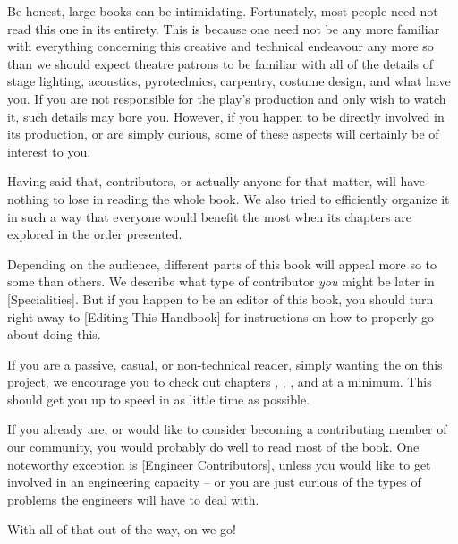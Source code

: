 

Be honest, large books can be intimidating. Fortunately, most people need not read this one in its entirety. This is because one need not be any more familiar with everything concerning this creative and technical endeavour any more so than we should expect theatre patrons to be familiar with all of the details of stage lighting, acoustics, pyrotechnics, carpentry, costume design, and what have you. If you are not responsible for the play's production and only wish to watch it, such details may bore you. However, if you happen to be directly involved in its production, or are simply curious, some of these aspects will certainly be of interest to you.

Having said that, contributors, or actually anyone for that matter, will have nothing to lose in reading the whole book. We also tried to efficiently organize it in such a way that everyone would benefit the most when its chapters are explored in the order presented.

Depending on the audience, different parts of this book will appeal more so to some than others. We describe what type of contributor {\it you} might be later in [Specialities]. But if you happen to be an editor of this book, you should turn right away to [Editing This Handbook] for instructions on how to properly go about doing this.

If you are a passive, casual, or non-technical reader, simply wanting the  on this project, we encourage you to check out chapters \in[Leitmotifs], , , and \in[Timeline] at a minimum. This should get you up to speed in as little time as possible.

If you already are, or would like to consider becoming a contributing member of our community, you would probably do well to read most of the book. One noteworthy exception is [Engineer Contributors], unless you would like to get involved in an engineering capacity -- or you are just curious of the types of problems the engineers will have to deal with.

With all of that out of the way, on we go!

\StopChapter

